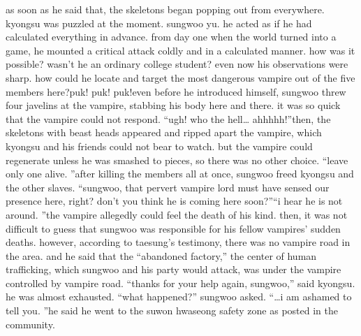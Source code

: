 as soon as he said that, the skeletons began popping out from everywhere.
kyongsu was puzzled at the moment.
sungwoo yu.
 he acted as if he had calculated everything in advance.
 from day one when the world turned into a game, he mounted a critical attack coldly and in a calculated manner.
how was it possible? wasn’t he an ordinary college student? even now his observations were sharp.
 how could he locate and target the most dangerous vampire out of the five members here?puk! puk! puk!even before he introduced himself, sungwoo threw four javelins at the vampire, stabbing his body here and there.
 it was so quick that the vampire could not respond.
“ugh! who the hell… ahhhhh!”then, the skeletons with beast heads appeared and ripped apart the vampire, which kyongsu and his friends could not bear to watch.
 but the vampire could regenerate unless he was smashed to pieces, so there was no other choice.
“leave only one alive.
”after killing the members all at once, sungwoo freed kyongsu and the other slaves.
“sungwoo, that pervert vampire lord must have sensed our presence here, right? don’t you think he is coming here soon?”“i hear he is not around.
”the vampire allegedly could feel the death of his kind.
 then, it was not difficult to guess that sungwoo was responsible for his fellow vampires’ sudden deaths.
however, according to taesung’s testimony, there was no vampire road in the area.
and he said that the “abandoned factory,” the center of human trafficking, which sungwoo and his party would attack, was under the vampire controlled by vampire road.
“thanks for your help again, sungwoo,” said kyongsu.
 he was almost exhausted.
“what happened?” sungwoo asked.
“…i am ashamed to tell you.
”he said he went to the suwon hwaseong safety zone as posted in the community.


 